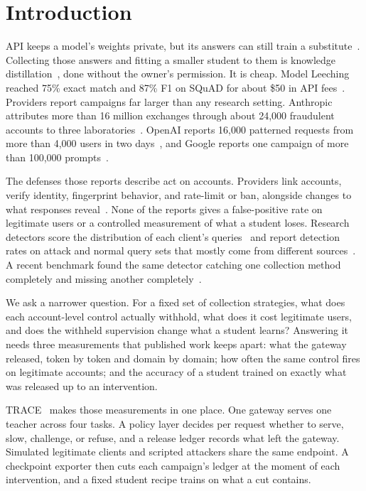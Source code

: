 \documentclass[journal]{IEEEtran}
\begin{document}
\section{Introduction}
 API keeps a model's weights private, but its answers can still train a substitute~\cite{tramer2016stealing,orekondy2019knockoff}. Collecting those answers and fitting a smaller student to them is knowledge distillation~\cite{hinton2015distilling,kim2016sequence}, done without the owner's permission. It is cheap. Model Leeching reached 75\% exact match and 87\% F1 on SQuAD for about \$50 in API fees~\cite{birch2023leeching}. Providers report campaigns far larger than any research setting. Anthropic attributes more than 16 million exchanges through about 24,000 fraudulent accounts to three laboratories~\cite{anthropic2026detecting}. OpenAI reports 16,000 patterned requests from more than 4,000 users in two days~\cite{openai2026disrupting}, and Google reports one campaign of more than 100,000 prompts~\cite{gtig2026distillation}.

The defenses those reports describe act on accounts. Providers link accounts, verify identity, fingerprint behavior, and rate-limit or ban, alongside changes to what responses reveal~\cite{anthropic2026detecting,anthropic2026defenses,openai2026disrupting}. None of the reports gives a false-positive rate on legitimate users or a controlled measurement of what a student loses. Research detectors score the distribution of each client's queries~\cite{juuti2019prada,kesarwani2018warning,pal2021stateful,liu2026detector} and report detection rates on attack and normal query sets that mostly come from different sources~\cite{liu2026detector}. A recent benchmark found the same detector catching one collection method completely and missing another completely~\cite{liu2026lifecycle}.

We ask a narrower question. For a fixed set of collection strategies, what does each account-level control actually withhold, what does it cost legitimate users, and does the withheld supervision change what a student learns? Answering it needs three measurements that published work keeps apart: what the gateway released, token by token and domain by domain; how often the same control fires on legitimate accounts; and the accuracy of a student trained on exactly what was released up to an intervention.

TRACE~\cite{trace2026artifact} makes those measurements in one place. One gateway serves one teacher across four tasks. A policy layer decides per request whether to serve, slow, challenge, or refuse, and a release ledger records what left the gateway. Simulated legitimate clients and scripted attackers share the same endpoint. A checkpoint exporter then cuts each campaign's ledger at the moment of each intervention, and a fixed student recipe trains on what a cut contains.
\end{document}
